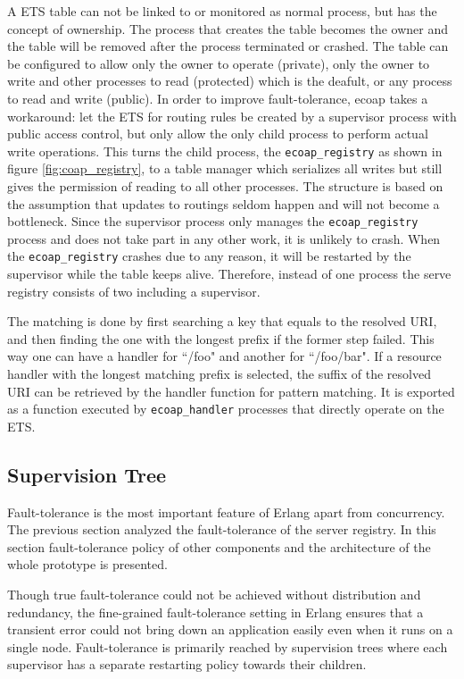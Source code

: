 A ETS table can not be linked to or monitored as normal process, but has the concept of ownership. The process that creates the table becomes the owner and the table will be removed after the process terminated or crashed. The table can be configured to allow only the owner to operate (private), only the owner to write and other processes to read (protected) which is the deafult, or any process to read and write (public). In order to improve fault-tolerance, ecoap takes a workaround: let the ETS for routing rules be created by a supervisor process with public access control, but only allow the only child process to perform actual write operations. This turns the child process, the \verb|ecoap_registry| as shown in figure \ref{fig:coap_registry}, to a table manager which serializes all writes but still gives the permission of reading to all other processes. The structure is based on the assumption that updates to routings seldom happen and will not become a bottleneck. Since the supervisor process only manages the \verb|ecoap_registry| process and does not take part in any other work, it is unlikely to crash. When the \verb|ecoap_registry| crashes due to any reason, it will be restarted by the supervisor while the table keeps alive. Therefore, instead of one process the serve registry consists of two including a supervisor. 

The matching is done by first searching a key that equals to the resolved URI, and then finding the one with the longest prefix if the former step failed. This way one can have a handler for ``/foo" and another for ``/foo/bar". If a resource handler with the longest matching prefix is selected, the suffix of the resolved URI can be retrieved by the handler function for pattern matching. It is exported as a function executed by \verb|ecoap_handler| processes that directly operate on the ETS. 

\subsection{Supervision Tree}\label{supervision_tree}

Fault-tolerance is the most important feature of Erlang apart from concurrency. The previous section analyzed the fault-tolerance of the server registry. In this section fault-tolerance policy of other components and the architecture of the whole prototype is presented.

Though true fault-tolerance could not be achieved without distribution and redundancy, the fine-grained fault-tolerance setting in Erlang ensures that a transient error could not bring down an application easily even when it runs on a single node. Fault-tolerance is primarily reached by supervision trees where each supervisor has a separate restarting policy towards their children. 

